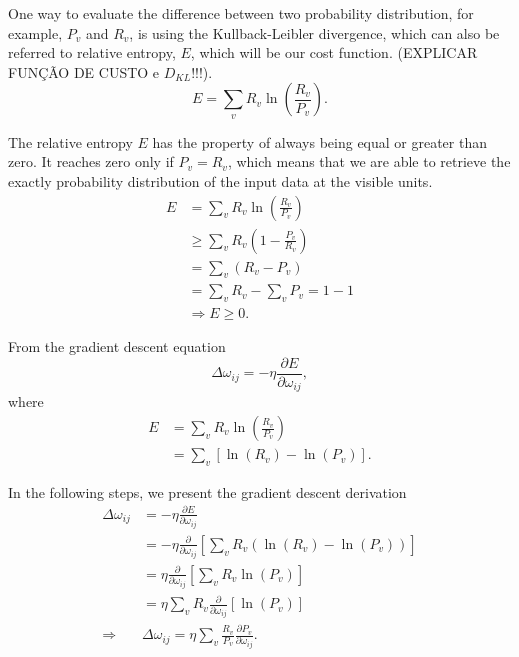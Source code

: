 One way to evaluate the difference between two probability distribution, for example, $P_{v}$ and $R_{v}$, is using the Kullback-Leibler divergence, which can also be referred to relative entropy, $E$, which will be our cost function.
(EXPLICAR FUN\c{C}\~{A}O DE CUSTO e $D_{KL}$!!!).
\begin{equation}
  E = \sum_{v} R_{v} \ln{\left(\frac{R_{v}}{P_{v}}\right)}.
  \label{eq:DKL}
\end{equation}

The relative entropy $E$ has the property of always being equal or greater than zero.
It reaches zero only if $P_{v} = R_{v}$, which means that we are able to retrieve the exactly probability distribution of the input data at the visible units.
\begin{equation}
  \begin{split}
    E & = \sum_{v} R_{v} \ln{\left( \frac{R_{v}}{P_{v}} \right)} \\
      & \geq \sum_{v} R_{v} \left( 1 - \frac{P_{v}}{R_{v}} \right) \\
      & = \sum_{v} \left( R_{v} - P_{v} \right) \\
      & = \sum_{v} R_{v} - \sum_{v} P_{v} = 1 - 1 \\
      & \Rightarrow E \geq 0.
  \end{split}
\end{equation}

From the gradient descent equation
\begin{equation}
  \Delta \omega_{ij} = -\eta \frac{\partial E}{\partial \omega_{ij}},
  \label{eq:gradient}
\end{equation}
where
\begin{equation}
  \begin{split}
    E & = \sum_{v} R_{v} \ln{\left(\frac{R_{v}}{P_{v}}\right)} \\
      & = \sum_{v} \left[ \ln{(R_{v})} - \ln{(P_{v})} \right].
  \end{split}
  \label{eq:entropy1}
\end{equation}

In the following steps, we present the gradient descent derivation
\begin{equation}
  \begin{split}
    \Delta \omega_{ij} & = - \eta \frac{\partial E}{\partial \omega_{ij}} \\
                  & = - \eta \frac{\partial}{\partial \omega_{ij}} \left[ \sum_{v} R_{v} \left( \ln{(R_{v})} - \ln{(P_{v})} \right) \right] \\
                  & = \eta \frac{\partial}{\partial \omega_{ij}} \left[ \sum_{v} R_{v} \ln{(P_{v})} \right] \\
                  & = \eta \sum_{v} R_{v} \frac{\partial}{\partial \omega_{ij}} \left[ \ln{(P_{v})} \right] \\
                  \Rightarrow & \Delta \omega_{ij} = \eta \sum_{v} \frac{R_{v}}{P_{v}} \frac{\partial P_{v}}{\partial \omega_{ij}}.
  \end{split}
  \label{eq:grad1}
\end{equation}

